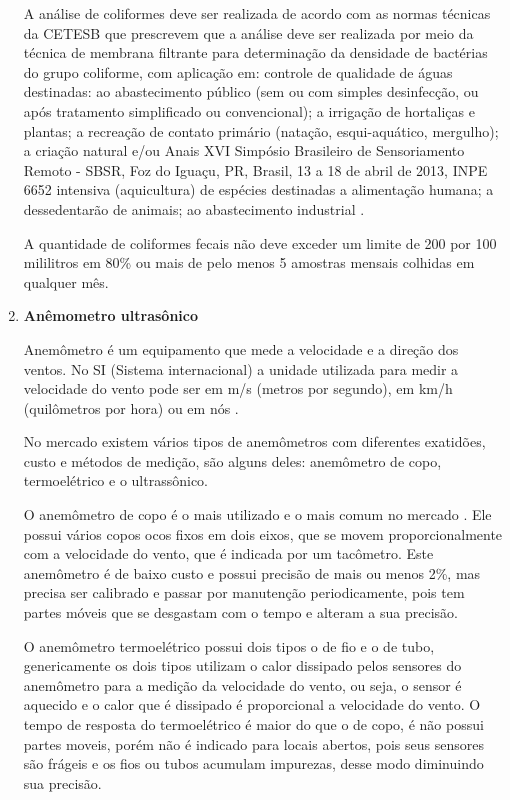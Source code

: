 \begin{enumerate}
	A análise de coliformes deve ser realizada de acordo com as normas técnicas da CETESB que prescrevem que a análise
	deve ser realizada por meio da técnica de membrana filtrante para determinação da densidade de bactérias do grupo
	coliforme, com aplicação em: controle de qualidade de águas destinadas: ao abastecimento público (sem ou com simples
	desinfecção, ou após tratamento simplificado ou convencional); a irrigação de hortaliças e plantas; a recreação de
	contato primário (natação, esqui-aquático, mergulho); a criação natural e/ou Anais XVI Simpósio Brasileiro de
	Sensoriamento Remoto - SBSR, Foz do Iguaçu, PR, Brasil, 13 a 18 de abril de 2013, INPE 6652 intensiva (aquicultura)
	de espécies destinadas a alimentação humana; a dessedentarão de animais; ao abastecimento industrial \cite{cetesb84}.
	
	A quantidade de coliformes fecais não deve exceder um limite de 200 por 100 mililitros em 80\% ou mais de pelo menos
	5 amostras mensais colhidas em qualquer mês.
	
    \item \textbf{Anêmometro ultrasônico}
    
	Anemômetro é um equipamento que mede a velocidade e a direção dos ventos. No SI (Sistema internacional) a unidade
	utilizada para medir a velocidade do vento pode ser em m/s (metros por segundo), em km/h (quilômetros por hora) ou
	em nós \cite{almeida04}.
	
	No mercado existem vários tipos de anemômetros com diferentes exatidões, custo e métodos de medição, são alguns deles: 
	anemômetro de copo, termoelétrico e o ultrassônico.
	
	O anemômetro de copo é o mais utilizado e o mais comum no mercado \cite{cyliax06}. Ele possui vários copos ocos
	fixos em dois eixos, que se movem proporcionalmente com a velocidade do vento, que é indicada por um tacômetro. Este
	anemômetro é de baixo custo e possui precisão de mais ou menos 2\%, mas precisa ser calibrado e passar por manutenção
	periodicamente, pois tem partes móveis que se desgastam com o tempo e alteram a sua precisão.
	
	O anemômetro termoelétrico possui dois tipos o de fio e o de tubo, genericamente os dois tipos utilizam o calor dissipado
	pelos sensores do anemômetro para a medição da velocidade do vento, ou seja, o sensor é aquecido e o calor que é dissipado
	é proporcional a velocidade do vento.  O tempo de resposta do termoelétrico é maior do que o de copo, é não possui partes
	moveis, porém não é indicado para locais abertos, pois seus sensores são frágeis e os fios ou tubos acumulam impurezas,
	desse modo diminuindo sua precisão.
	

\end{enumerate}
